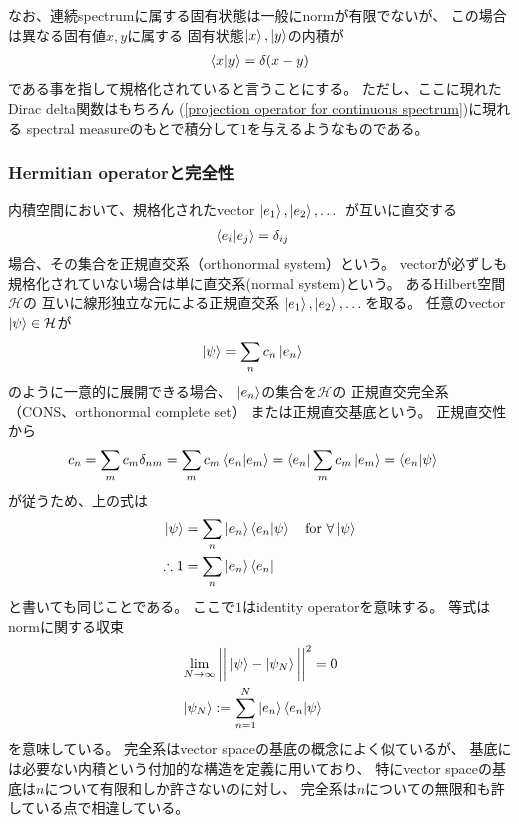 なお、連続spectrumに属する固有状態は一般にnormが有限でないが、
この場合は異なる固有値$x, y$に属する
固有状態$\ket{x}, \ket{y}$の内積が
\begin{align}
    \braket{x|y} = \delta(x-y)
\label{continuous spectrum normalization}
\end{align}
である事を指して規格化されていると言うことにする。
ただし、ここに現れたDirac delta関数はもちろん
(\ref{projection operator for continuous spectrum})に現れる
spectral measureのもとで積分して$1$を与えるようなものである。

\subsubsection{Hermitian operatorと完全性}

内積空間において、規格化されたvector
$\ket{e_1},\ket{e_2},\dots$
が互いに直交する
\begin{align}
    \braket{e_i | e_j} &= \delta_{ij}
\end{align}
場合、その集合を正規直交系（orthonormal system）という。
vectorが必ずしも規格化されていない場合は単に直交系(normal system)という。
あるHilbert空間$\mathcal{H}$の
互いに線形独立な元による正規直交系
$\ket{e_1},\ket{e_2},\dots$を取る。
任意のvector
$\ket{\psi} \in \mathcal{H}$が
\begin{align}
    \ket{\psi}
    &=\sum_n c_n \ket{e_n}
\end{align}
のように一意的に展開できる場合、
$\ket{e_n}$の集合を$\mathcal{H}$の
正規直交完全系（CONS、orthonormal complete set）
または正規直交基底という。
正規直交性から
\begin{align}
    c_n &=
    \sum_m c_m \delta_{nm}
    =\sum_m c_m \braket{e_n|e_m}
    = \bra{e_n} \sum_m c_m \ket{e_m}
    = \braket{e_n | \psi}
\end{align}
が従うため、上の式は
\begin{align}
    \ket{\psi}
    &=\sum_n \ket{e_n} \braket{e_n | \psi}
    \quad\text{for $\forall \ket{\psi}$}
\notag\\
\therefore
    1
    &=
    \sum _n \ket{e_n}\bra{e_n}
\end{align}
と書いても同じことである。
ここで$1$はidentity operatorを意味する。
等式はnormに関する収束
\begin{subequations}
\begin{align}
    &\lim_{N\to\infty}\bigg|\bigg|
        \ket{\psi} - \ket{\psi_N}
    \bigg|\bigg|^2
    = 0
\label{convergence of norm}
\\
    &\ket{\psi_N}
    :=
    \sum_{n=1}^N \ket{e_n} \braket{e_n | \psi}
\end{align}
\end{subequations}
を意味している。
完全系はvector spaceの基底の概念によく似ているが、
基底には必要ない内積という付加的な構造を定義に用いており、
特にvector spaceの基底は$n$について有限和しか許さないのに対し、
完全系は$n$についての無限和も許している点で相違している。

